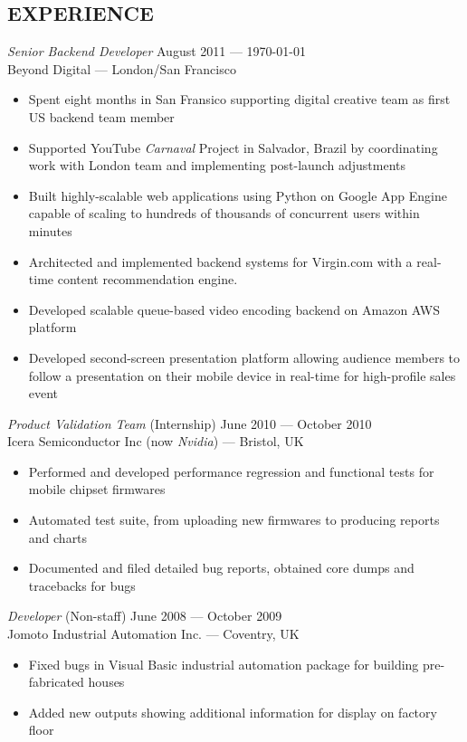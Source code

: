 \documentclass[margin, 10pt]{res} %
\begin{document}
\begin{resume}
\section{EXPERIENCE}

{\sl Senior Backend Developer} \hfill August 2011 --- \currentmonthyear\today \\
Beyond Digital --- London/San Francisco \\

\begin{itemize} \itemsep -2pt %
\item Spent eight months in San Fransico supporting digital creative team as first US backend team member
\item Supported YouTube \textit{Carnaval} Project in Salvador, Brazil by coordinating work with London team and implementing post-launch adjustments
\item Built highly-scalable web applications using Python on Google App Engine capable of scaling
to hundreds of thousands of concurrent users within minutes
\item Architected and implemented backend systems for Virgin.com with a real-time content recommendation engine.
\item Developed scalable queue-based video encoding backend on Amazon AWS platform
\item Developed second-screen presentation platform allowing audience members to follow a presentation on their mobile device in real-time for high-profile sales event
\end{itemize}

{\sl Product Validation Team} \hfill (Internship) June 2010 --- October 2010 \\
Icera Semiconductor Inc (now \textit{Nvidia}) --- Bristol, UK \\
\begin{itemize} 
\item Performed and developed performance regression and functional tests for mobile chipset firmwares
\item Automated test suite, from uploading new firmwares to producing reports and charts
\item Documented and filed detailed bug reports, obtained core dumps and tracebacks for bugs
\end{itemize} 
\clearpage
{\sl Developer} \hfill (Non-staff) June 2008 --- October 2009 \\
Jomoto Industrial Automation Inc. --- Coventry, UK \\
\begin{itemize}
\item Fixed bugs in Visual Basic industrial automation package for building pre-fabricated houses
\item Added new outputs showing additional information for display on factory floor
\end{itemize} 


\end{resume}
\end{document}
